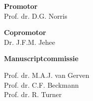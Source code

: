 {\setlength{\parindent}{0cm}\raggedright\smaller

\newpage

\hspace{-12pt}\textbf{Promotor}\\
Prof. dr. D.G. Norris
\vspace{12pt}

\hspace{-12pt}\textbf{Copromotor}\\
Dr. J.F.M. Jehee
\vspace{20pt}

\hspace{-12pt}\textbf{Manuscriptcommissie}

\vspace{6pt}
Prof. dr. M.A.J. van Gerven\\

\vspace{6pt}
Prof. dr. C.F. Beckmann\\

\vspace{6pt}
Prof. dr. R. Turner\\

\vfill
}

\newpage


\thispagestyle{empty}

{\setlength{\parindent}{0cm}
\begin{flushright}
\end{flushright}
}

